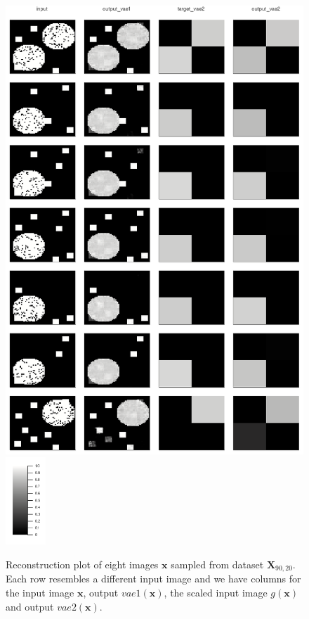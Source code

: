 \documentclass[12pt]{report}
\theoremstyle{definition}
\begin{document}
\begin{figure}
\begin{center}
  \includegraphics[width=11.5cm]{../code/plots/reconstruction3_48_55.png}
  \includegraphics[width=1.5cm]{../code/plots/scale.png}
  \caption{Reconstruction plot of eight images $\mathbf{x}$ sampled from dataset $\mathbf{X}_{90, 20}$. Each row resembles a different input image and we have columns for the input image $\mathbf{x}$, output $vae1(\mathbf{x})$, the scaled input image $g(\mathbf{x})$ and output $vae2(\mathbf{x})$.}
  \label{fig:recon3}
\end{center}
\end{figure}
\end{document}
